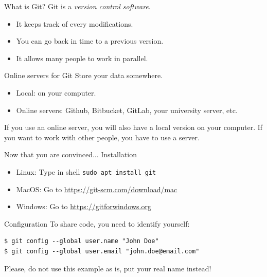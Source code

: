 \documentclass{beamer}
\newcommand{\cmd}[1]{\fbox{\color{black}\texttt{#1}}}
\begin{document}
	\begin{frame}{What is Git?}
		Git is a \textit{version control software}. \newline
		
		\begin{itemize}
			\item It keeps track of every modifications.
			\item You can go back in time to a previous version.
			\item It allows many people to work in parallel.
		\end{itemize}	
	\end{frame}

	\begin{frame}{Online servers for Git}
		Store your data somewhere. \newline 
			\begin{itemize}
				\item Local: on your computer.
				\item Online servers: Github, Bitbucket, GitLab, your university server, etc. \newline
			\end{itemize}
		If you use an online server, you will also have a local version on your computer. If you want to work with other people, you have to use a server. 
	\end{frame}

	\begin{frame}{Now that you are convinced... Installation}
		\begin{itemize}
			\item Linux: Type in shell \texttt{sudo apt install git}
			\item MacOS: Go to \url{https://git-scm.com/download/mac}
			\item Windows: Go to \url{https://gitforwindows.org}
		\end{itemize}
	\end{frame}

	\begin{frame}[fragile]{Configuration \hfill \cmd{config}}
	To share code, you need to identify yourself:
	\begin{verbatim}
$ git config --global user.name "John Doe"
$ git config --global user.email "john.doe@email.com"
	\end{verbatim}
	Please, do not use this example as is, put your real name instead!
	\end{frame}
\end{document}
